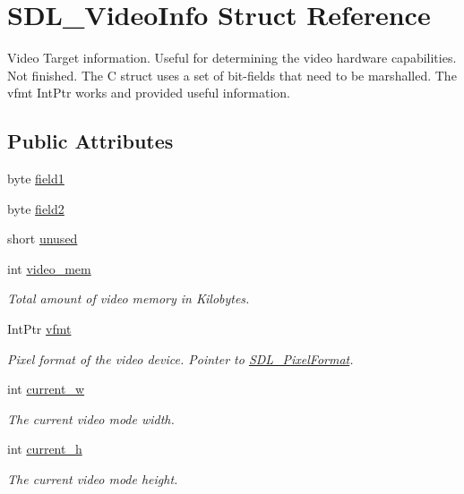 \hypertarget{struct_s_d_l___video_info}{
\section{SDL\_\-VideoInfo Struct Reference}
\label{struct_s_d_l___video_info}
}


Video Target information. Useful for determining the video hardware capabilities. Not finished. The C struct uses a set of bit-\/fields that need to be marshalled. The vfmt IntPtr works and provided useful information.  


\subsection*{Public Attributes}
\begin{DoxyCompactItemize}
\item 
byte \hyperlink{struct_s_d_l___video_info_ad74c1e538480d88be4654b1309150b2d}{field1}
\item 
byte \hyperlink{struct_s_d_l___video_info_adda8d23e9a7a285a775ea8e644ede26e}{field2}
\item 
short \hyperlink{struct_s_d_l___video_info_a21045d5bb10f224a4e2f7d454f6401e8}{unused}
\item 
int \hyperlink{struct_s_d_l___video_info_af97199a981aafa4f7083f3a3982f8f0b}{video\_\-mem}
\begin{DoxyCompactList}\small\item\em Total amount of video memory in Kilobytes. \item\end{DoxyCompactList}\item 
IntPtr \hyperlink{struct_s_d_l___video_info_ac33337330f3d93eed72dd3ca72b11fd9}{vfmt}
\begin{DoxyCompactList}\small\item\em Pixel format of the video device. Pointer to \hyperlink{struct_s_d_l___pixel_format}{SDL\_\-PixelFormat}. \item\end{DoxyCompactList}\item 
int \hyperlink{struct_s_d_l___video_info_ad56534a96546b338a2a80f16ef827a8b}{current\_\-w}
\begin{DoxyCompactList}\small\item\em The current video mode width. \item\end{DoxyCompactList}\item 
int \hyperlink{struct_s_d_l___video_info_a9c9088f016548b23957dffa7613ac8de}{current\_\-h}
\begin{DoxyCompactList}\small\item\em The current video mode height. \item\end{DoxyCompactList}\end{DoxyCompactItemize}
